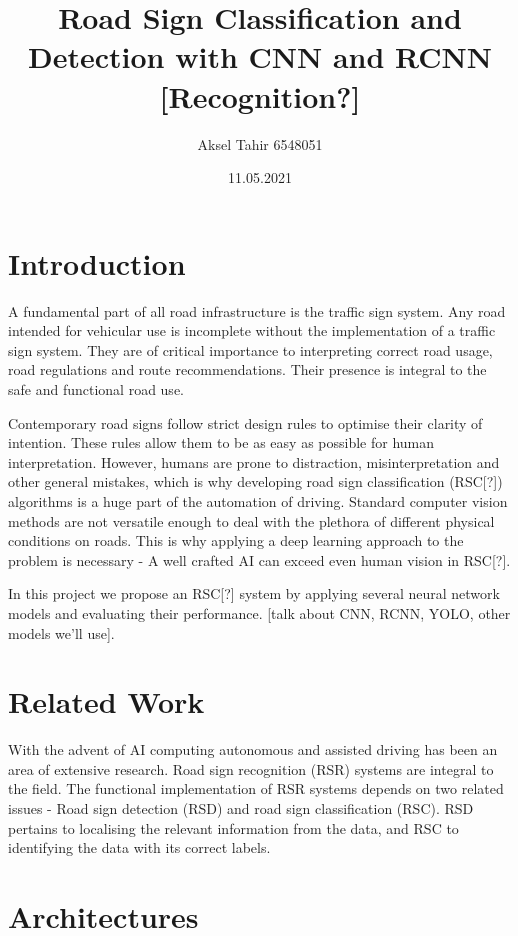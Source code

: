 \documentclass[12pt]{article}
\title{Road Sign Classification and Detection with CNN and RCNN [Recognition?]}
\author{Aksel Tahir 6548051}
\date{11.05.2021}
\begin{document}
\maketitle

\tableofcontents

\section{Introduction}

A fundamental part of all road infrastructure is the traffic sign system. Any
road intended for vehicular use is incomplete without the implementation of a
traffic sign system. They are of critical importance to interpreting correct
road usage, road regulations and route recommendations. Their presence is
integral to the safe and functional road use.

Contemporary road signs follow strict design rules to optimise their clarity of
intention. These rules allow them to be as easy as possible for human
interpretation. However, humans are prone to distraction, misinterpretation and
other general mistakes, which is why developing road sign classification
(RSC[?]) algorithms is a huge part of the automation of driving. Standard
computer vision methods are not versatile enough to deal with the plethora of
different physical conditions on roads. This is why applying a deep learning
approach to the problem is necessary - A well crafted AI can exceed even human
vision in RSC[?].

In this project we propose an RSC[?] system by applying several neural network
models and evaluating their performance. [talk about CNN, RCNN, YOLO, other
models we'll use].


\section{Related Work}
With the advent of AI computing autonomous and assisted driving has been an area
of extensive research. Road sign recognition (RSR) systems are integral to the
field. The functional implementation of RSR systems depends on two related
issues - Road sign detection (RSD) and road sign classification (RSC). RSD
pertains to localising the relevant information from the data, and RSC to
identifying the data with its correct labels.
\cite[1]{rachmadi} 

\section{Architectures}
\end{document}
